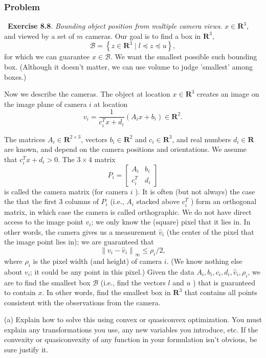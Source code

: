 \documentclass[12pt,reqno]{article}
\theoremstyle{definition}
\numberwithin{equation}{section}
\begin{document}
\subsubsection*{Problem}

~\cite{EE364a-extra}\textbf{Exercise 8.8}. \textit{Bounding object position from multiple camera views}.
$x \in \mathbf{R}^3$, and viewed by a set of $m$ cameras. Our goal is to find a box in $\mathbf{R}^3$,
\[
\mathcal{B}=\left\{z \in \mathbf{R}^3 \mid l \preceq z \preceq u\right\},
\]
for which we can guarantee $x \in \mathcal{B}$. We want the smallest possible such bounding box. (Although it doesn't matter, we can use volume to judge 'smallest' among boxes.)

\noindent Now we describe the cameras. The object at location $x \in \mathbf{R}^3$ creates an image on the image plane of camera $i$ at location
\[
v_i=\frac{1}{c_i^T x+d_i}\left(A_i x+b_i\right) \in \mathbf{R}^2 .
\]

\noindent The matrices $A_i \in \mathbf{R}^{2 \times 3}$, vectors $b_i \in \mathbf{R}^2$ and $c_i \in \mathbf{R}^3$, and real numbers $d_i \in \mathbf{R}$ are known, and depend on the camera positions and orientations. We assume that $c_i^T x+d_i>0$. The $3 \times 4$ matrix
\[
P_i=\left[\begin{array}{ll}
A_i & b_i \\
c_i^T & d_i
\end{array}\right]
\]
is called the camera matrix (for camera $i$ ). It is often (but not always) the case the that the first 3 columns of $P_i$ (i.e., $A_i$ stacked above $c_i^T$ ) form an orthogonal matrix, in which case the camera is called orthographic.
We do not have direct access to the image point $v_i$; we only know the (square) pixel that it lies in. In other words, the camera gives us a measurement $\hat{v}_i$ (the center of the pixel that the image point lies in); we are guaranteed that
\[
\left\|v_i-\hat{v}_i\right\|_{\infty} \leq \rho_i / 2,
\]
where $\rho_i$ is the pixel width (and height) of camera $i$. (We know nothing else about $v_i$; it could be any point in this pixel.)
Given the data $A_i, b_i, c_i, d_i, \hat{v}_i, \rho_i$, we are to find the smallest box $\mathcal{B}$ (i.e., find the vectors $l$ and $u$ ) that is guaranteed to contain $x$.
In other words, find the smallest box in $\mathbf{R}^3$ that contains all points consistent with the observations from the camera.

\vspace{0.1cm}
\noindent (a) Explain how to solve this using convex or quasiconvex optimization. You must explain any transformations you use, any new variables you introduce, etc.
If the convexity or quasiconvexity of any function in your formulation isn't obvious, be sure justify it.
\end{document}
